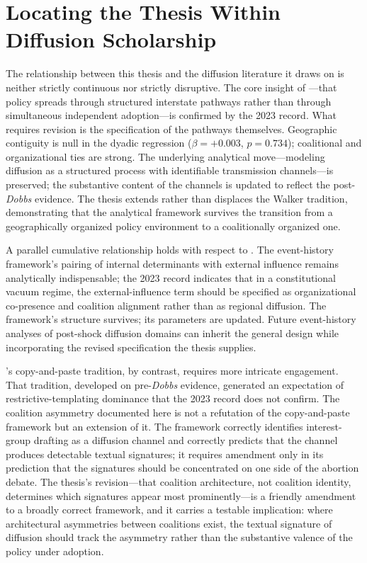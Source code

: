 \section{Locating the Thesis Within Diffusion Scholarship}
 
The relationship between this thesis and the diffusion literature it draws on is neither strictly continuous nor strictly disruptive. The core insight of \textcite{walkerDiffusionInnovationsAmerican1969}---that policy spreads through structured interstate pathways rather than through simultaneous independent adoption---is confirmed by the 2023 record. What requires revision is the specification of the pathways themselves. Geographic contiguity is null in the dyadic regression ($\beta = +0.003$, $p = 0.734$); coalitional and organizational ties are strong. The underlying analytical move---modeling diffusion as a structured process with identifiable transmission channels---is preserved; the substantive content of the channels is updated to reflect the post-\textit{Dobbs} evidence. The thesis extends rather than displaces the Walker tradition, demonstrating that the analytical framework survives the transition from a geographically organized policy environment to a coalitionally organized one.
 
A parallel cumulative relationship holds with respect to \textcite{berryStateLotteryAdoptions1990}. The event-history framework's pairing of internal determinants with external influence remains analytically indispensable; the 2023 record indicates that in a constitutional vacuum regime, the external-influence term should be specified as organizational co-presence and coalition alignment rather than as regional diffusion. The framework's structure survives; its parameters are updated. Future event-history analyses of post-shock diffusion domains can inherit the general design while incorporating the revised specification the thesis supplies.
 
\textcite{jansaCopyPasteLawmaking2019}'s copy-and-paste tradition, by contrast, requires more intricate engagement. That tradition, developed on pre-\textit{Dobbs} evidence, generated an expectation of restrictive-templating dominance that the 2023 record does not confirm. The coalition asymmetry documented here is not a refutation of the copy-and-paste framework but an extension of it. The framework correctly identifies interest-group drafting as a diffusion channel and correctly predicts that the channel produces detectable textual signatures; it requires amendment only in its prediction that the signatures should be concentrated on one side of the abortion debate. The thesis's revision---that coalition architecture, not coalition identity, determines which signatures appear most prominently---is a friendly amendment to a broadly correct framework, and it carries a testable implication: where architectural asymmetries between coalitions exist, the textual signature of diffusion should track the asymmetry rather than the substantive valence of the policy under adoption.
 
